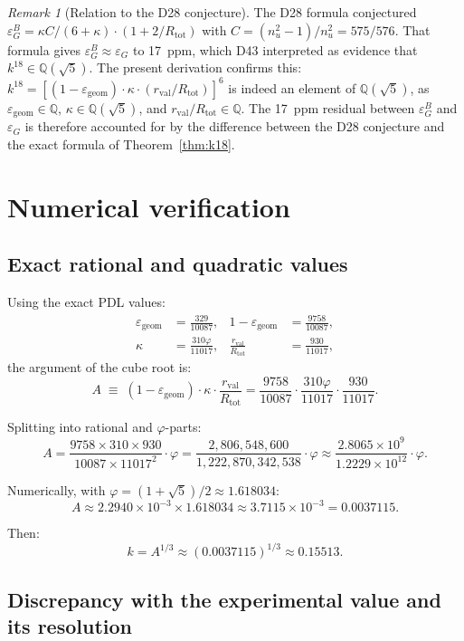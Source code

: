 \documentclass[12pt,a4paper]{article}
\theoremstyle{plain}
\theoremstyle{definition}
\theoremstyle{remark}
\newtheorem{remark}[theorem]{Remark}
\newcommand{\vp}{\varphi}
\newcommand{\kap}{\kappa}
\newcommand{\rval}{r_{\mathrm{val}}}
\newcommand{\Rtot}{R_{\mathrm{tot}}}
\newcommand{\egeom}{\varepsilon_{\mathrm{geom}}}
\newcommand{\eG}{\varepsilon_G}
\newcommand{\eGB}{\varepsilon_G^B}
\begin{document}
\begin{remark}[Relation to the D28 conjecture]
The D28 formula \citep{D28} conjectured $\eGB = \kap C/(6+\kap)\cdot(1+2/\Rtot)$ with $C = (n_u^2-1)/n_u^2 = 575/576$. That formula gives $\eGB \approx \eG$ to 17~ppm, which D43 \citep{D43} interpreted as evidence that $k^{18}\in\mathbb{Q}(\sqrt{5})$. The present derivation confirms this: $k^{18} = [(1-\egeom)\cdot\kap\cdot(\rval/\Rtot)]^6$ is indeed an element of $\mathbb{Q}(\sqrt{5})$, as $\egeom\in\mathbb{Q}$, $\kap\in\mathbb{Q}(\sqrt{5})$, and $\rval/\Rtot\in\mathbb{Q}$. The 17~ppm residual between $\eGB$ and $\eG$ is therefore accounted for by the difference between the D28 conjecture and the exact formula of Theorem~\ref{thm:k18}.
\end{remark}

\section{Numerical verification}
\label{sec:verification}

\subsection{Exact rational and quadratic values}

Using the exact PDL values:
\begin{align*}
\egeom &= \frac{329}{10087}, & 1 - \egeom &= \frac{9758}{10087},\\
\kap &= \frac{310\vp}{11017}, & \frac{\rval}{\Rtot} &= \frac{930}{11017},
\end{align*}
the argument of the cube root is:
\[
A \;\equiv\; (1-\egeom)\cdot\kap\cdot\frac{\rval}{\Rtot} = \frac{9758}{10087}\cdot\frac{310\vp}{11017}\cdot\frac{930}{11017}.
\]

Splitting into rational and $\vp$-parts:
\[
A = \frac{9758\times 310\times 930}{10087\times 11017^2}\cdot\vp = \frac{2{,}806{,}548{,}600}{1{,}222{,}870{,}342{,}538}\cdot\vp \approx \frac{2.8065\times 10^9}{1.2229\times 10^{12}}\cdot\vp.
\]

Numerically, with $\vp = (1+\sqrt{5})/2 \approx 1.618034$:
\[
A \approx 2.2940\times 10^{-3}\times 1.618034 \approx 3.7115\times 10^{-3} = 0.0037115.
\]

Then:
\[
k = A^{1/3} \approx (0.0037115)^{1/3} \approx 0.15513.
\]

\subsection{Discrepancy with the experimental value and its resolution}
\label{subsec:discrepancy}
\end{document}
